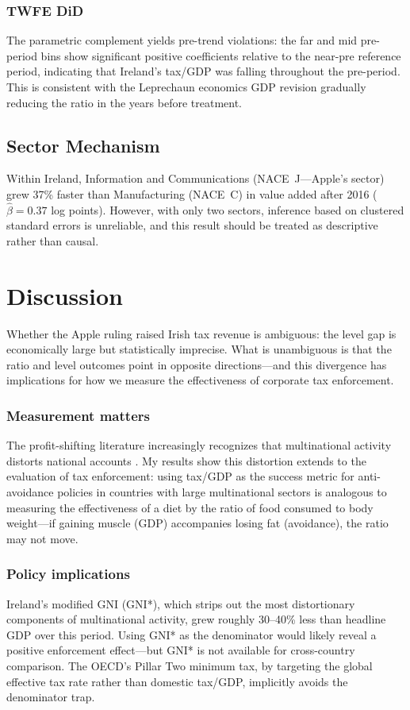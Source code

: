 \documentclass[12pt]{article}
\begin{document}
\subsubsection*{TWFE DiD} The parametric complement yields pre-trend violations: the far and mid pre-period bins show significant positive coefficients relative to the near-pre reference period, indicating that Ireland's tax/GDP was falling throughout the pre-period. This is consistent with the Leprechaun economics GDP revision gradually reducing the ratio in the years before treatment.

\subsection{Sector Mechanism}

Within Ireland, Information and Communications (NACE~J---Apple's sector) grew 37\% faster than Manufacturing (NACE~C) in value added after 2016 ($\hat{\beta} = 0.37$ log points). However, with only two sectors, inference based on clustered standard errors is unreliable, and this result should be treated as descriptive rather than causal.

\section{Discussion}

Whether the Apple ruling raised Irish tax revenue is ambiguous: the level gap is economically large but statistically imprecise. What is unambiguous is that the ratio and level outcomes point in opposite directions---and this divergence has implications for how we measure the effectiveness of corporate tax enforcement.

\subsubsection*{Measurement matters} The profit-shifting literature increasingly recognizes that multinational activity distorts national accounts \citep{guvenen2022offshore, torslov2023missing}. My results show this distortion extends to the evaluation of tax enforcement: using tax/GDP as the success metric for anti-avoidance policies in countries with large multinational sectors is analogous to measuring the effectiveness of a diet by the ratio of food consumed to body weight---if gaining muscle (GDP) accompanies losing fat (avoidance), the ratio may not move.

\subsubsection*{Policy implications} Ireland's modified GNI (GNI*), which strips out the most distortionary components of multinational activity, grew roughly 30--40\% less than headline GDP over this period. Using GNI* as the denominator would likely reveal a positive enforcement effect---but GNI* is not available for cross-country comparison. The OECD's Pillar Two minimum tax, by targeting the global effective tax rate rather than domestic tax/GDP, implicitly avoids the denominator trap.
\end{document}
